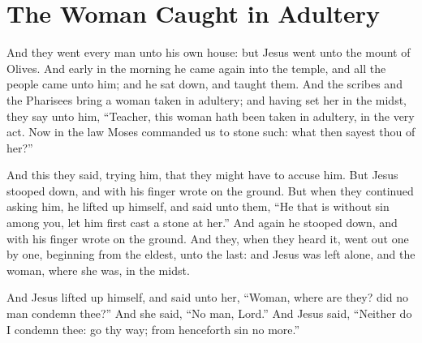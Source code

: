 \chapter{The Woman Caught in Adultery}
And they went every man unto his own house: but Jesus went unto the mount of Olives. And early in the morning he came again into the temple, and all the people came unto him; and he sat down, and taught them. And the scribes and the Pharisees bring a woman taken in adultery; and having set her in the midst, they say unto him, ``Teacher, this woman hath been taken in adultery, in the very act. Now in the law Moses commanded us to stone such: what then sayest thou of her?''
\par
And this they said, trying him, that they might have  to accuse him. But Jesus stooped down, and with his finger wrote on the ground. But when they continued asking him, he lifted up himself, and said unto them, ``He that is without sin among you, let him first cast a stone at her.'' And again he stooped down, and with his finger wrote on the ground. And they, when they heard it, went out one by one, beginning from the eldest,  unto the last: and Jesus was left alone, and the woman, where she was, in the midst.
\par
And Jesus lifted up himself, and said unto her, ``Woman, where are they? did no man condemn thee?'' And she said, ``No man, Lord.'' And Jesus said, ``Neither do I condemn thee: go thy way; from henceforth sin no more.''
